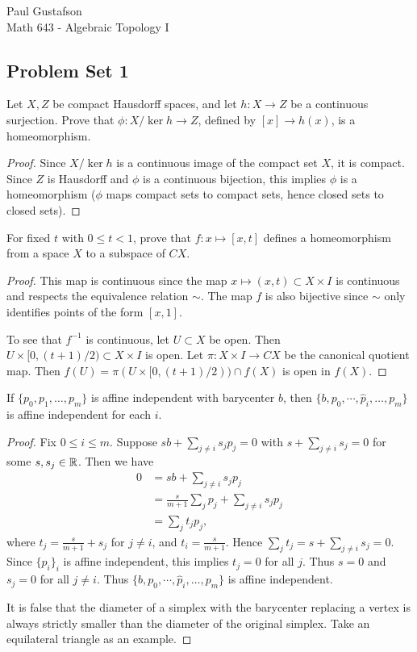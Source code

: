 \documentclass{article}
\begin{document}
\noindent Paul Gustafson\\
\noindent Math 643 - Algebraic Topology I


\subsection*{Problem Set 1}
 Let $X,Z$ be compact Hausdorff spaces, and let $h:X \to Z$ be a continuous
surjection. Prove that $\phi: X /\ker h \to Z$, defined by $[x] \to h(x)$, is a homeomorphism.
\begin{proof}
Since $X/\ker h$ is a continuous image of the compact set $X$, it is compact. Since $Z$
is Hausdorff and $\phi$ is a continuous bijection, this implies $\phi$ is a homeomorphism
($\phi$ maps compact sets to compact sets, hence closed sets to closed sets).
\end{proof}

 For fixed $t$ with $0 \le t < 1$, prove that $f: x \mapsto [x,t]$ defines a homeomorphism
from a space $X$ to a subspace of $CX$.
\begin{proof}
This map is continuous since the map $x \mapsto (x,t) \subset X \times I$ is continuous and
respects the equivalence relation $\sim$.  The map $f$ is also bijective since $\sim$ only identifies
points of the form $[x,1]$.  

To see that $f^{-1}$ is continuous, let $U \subset X$ be open. Then $U \times [0, (t+1)/2) \subset X \times I$
is open.  Let $\pi: X \times I \to CX$ be the canonical quotient map.
Then $f(U) = \pi(U \times [0, (t+1)/2)) \cap f(X)$ is open in $f(X)$.
\end{proof}

 If $\{p_0, p_1, \ldots, p_m\}$ is affine independent with barycenter $b$, then $\{b, p_0, \cdots, 
\hat p_i, \ldots, p_m \}$ is affine independent for each $i$.
\begin{proof}
Fix $0 \le i \le m$.  Suppose $sb + \sum_{j \neq i} s_j p_j = 0$ with $s + \sum_{j \neq i} s_j = 0$ for some $s,s_j \in \mathbb{R}$.
Then we have
\begin{align*}
0 & = sb + \sum_{j \neq i} s_j p_j \\
& = \frac{s}{m+1} \sum_j p_j + \sum_{j \neq i} s_j p_j \\
& = \sum_j t_j p_j,
\end{align*}
where $t_j = \frac{s}{m+1} + s_j$ for $j \neq i$, and $t_i = \frac{s}{m+1}$.
Hence $\sum_j t_j = s + \sum_{j \neq i} s_j = 0$.  Since $\{p_i\}_i$ is affine independent,
this implies $t_j = 0$ for all $j$.  Thus $s = 0$ and $s_j = 0$ for all $j \neq i$.
Thus $\{b, p_0, \cdots, \hat p_i, \ldots, p_m \}$ is affine independent.

It is false that the diameter of a simplex with the barycenter replacing a vertex is
always strictly smaller than the diameter of the original simplex. 
Take an equilateral triangle as an example.
\end{proof}
\end{document}
